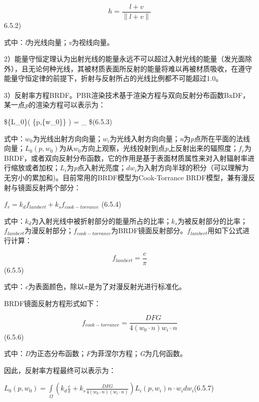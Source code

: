 \begin{equation}
h = \frac{{l + v}}{{\left\| {l + v} \right\|}}
\end{equation}6.5.2)

式中：\emph{l}为光线向量；\emph{v}为视线向量。

2）能量守恒定理认为出射光线的能量永远不可以超过入射光线的能量（发光面除外），且无论何种光线，其被材质表面所反射的能量将难以再被材质吸收，在遵守能量守恒定律的前提下，折射与反射所占的光线比例都不可能超过1.0。

3）反射率方程BRDF。PBR渲染技术基于渲染方程与双向反射分布函数BxDF，某一点\emph{p}的渲染方程可以表示为：

\$\{L\_0\}\left( \{p,\{w\_0\}\} \right) = \int\_ \$(6.5.3)

式中：\(w_0\)为光线出射方向向量；\(w_i\)为光线入射方向向量；\emph{n}为\emph{p}点所在平面的法线向量；\({L_0}\left( {p,{w_0}} \right)\)为从\(w_0\)方向上观察，光线投射到点\emph{p}上反射出来的辐照度；\(f_r\)为BRDF，或者双向反射分布函数，它的作用是基于表面材质属性来对入射辐射率进行缩放或者加权；\(L_i\)为\emph{p}点入射光亮度；\(dw_i\)为入射方向半球的积分（可以理解为无穷小的累加和)。目前常用的BRDF模型为Cook-Torrance BRDF模型，兼有漫反射与镜面反射两个部分：

\({f_r} = {k_d}{f_{lambert}} + {k_s}{f_{cook - torrance}}\) (6.5.4)

式中：\(k_d\)为入射光线中被折射部分的能量所占的比率；\(k_s\)为被反射部分的比率；\(f_{lambert}\)为漫反射部分；\(f_{cook-torrance}\)为BRDF镜面反射部分。\(f_{lambert}\)用如下公式进行计算：

\begin{equation}
f_{lambert}=\frac{c}{\pi}
\end{equation} (6.5.5)

式中：\emph{c}为表面颜色，除以\(\pi\)是为了对漫反射光进行标准化。

BRDF镜面反射方程形式如下：

\begin{equation}
f_{cook-torrance}=\frac{DFG}{4(w_0\cdot n){w_i \cdot n}}
\end{equation} (6.5.6)

式中：\emph{D}为正态分布函数；\emph{F}为菲涅尔方程；\emph{G}为几何函数。

因此，反射率方程最终可以表示为：

\({L_0}\left( {p,{w_0}} \right) = \int\limits_\Omega {\left( {{k_d}\frac{c}{\pi } + {k_s}\frac{{DFG}}{{4\left( {{w_0} \cdot n} \right)\left( {{w_i} \cdot n} \right)}}} \right){L_i}} \left( {p,{w_i}} \right)n \cdot {w_i}d{w_i}\)(6.5.7)

